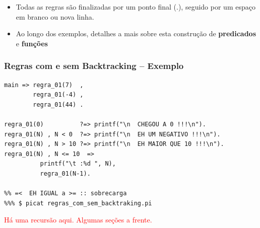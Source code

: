 \begin{frame}[fragile,allowframebreaks=0.8,c]
\begin{itemize}
\begin{itemize}
      \item \emph{Cabeça}: indica um padrão de regra a ser casada.
      
      Forma geral:
      \begin{tabbing}
          aa \= aaa \= aaa \= aaa \kill
          \> \> $regra(termo_1, \ldots,termo_n)$
      \end{tabbing}
      
      Onde:
      
      \begin{itemize}
          \item \emph{regra} é um átomo que define o nome da regra.
          \item \emph{n} é a aridade da regra (\emph{i.e.} o total de argumentos)
          \item Cada \emph{$termo_i$} é um argumento da regra.
      \end{itemize}
      
      \item \emph{Cond}: é uma ou várias condições sobre a execução desta regra.
          
      \item \emph{Corpo}: define as ações da regra 
      
  \end{itemize}
  
  \item Todas as regras são finalizadas por um ponto final (.), seguido por um espaço 
  em branco ou nova linha.
  
  \item Ao longo dos exemplos, detalhes a mais sobre esta construção de \textbf{predicados} e \textbf{funções}
      
\end{itemize}

\end{frame}


\begin{frame}[fragile]
	\frametitle{Regras com e sem Backtracking -- Exemplo}


\begin{footnotesize}
\begin{verbatim}
main => regra_01(7)  ,
        regra_01(-4) ,
        regra_01(44) .
        
regra_01(0)          ?=> printf("\n  CHEGOU A 0 !!!\n").
regra_01(N) , N < 0  ?=> printf("\n  EH UM NEGATIVO !!!\n").
regra_01(N) , N > 10 ?=> printf("\n  EH MAIOR QUE 10 !!!\n").
regra_01(N) , N <= 10  =>  
          printf("\t :%d ", N),
          regra_01(N-1).

%% =<  EH IGUAL a >= :: sobrecarga
%%% $ picat regras_com_sem_backtraking.pi

\end{verbatim}

\end{footnotesize}
\textcolor{red}{Há uma recursão aqui. Algumas seções a frente.}

\end{frame}


